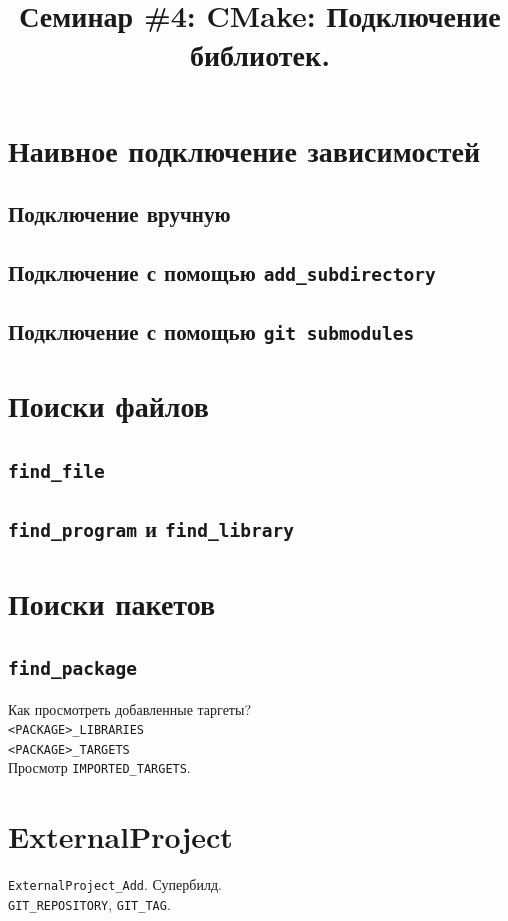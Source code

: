 \documentclass{article}
\begin{document}
\title{Семинар \#4: CMake: Подключение библиотек. \vspace{-5ex}}
\date{}\maketitle

\section{Наивное подключение зависимостей}
\subsection*{Подключение вручную}
\subsection*{Подключение с помощью \texttt{add\_subdirectory}}
\subsection*{Подключение с помощью \texttt{git submodules}}


\section{Поиски файлов}
\subsection*{\texttt{find\_file}}
\subsection*{\texttt{find\_program} и \texttt{find\_library}}


\section{Поиски пакетов}
\subsection*{\texttt{find\_package}}
Как просмотреть добавленные таргеты?\\
\texttt{<PACKAGE>\_LIBRARIES}\\
\texttt{<PACKAGE>\_TARGETS}\\
Просмотр \texttt{IMPORTED\_TARGETS}.


\section{ExternalProject}
\texttt{ExternalProject\_Add}. Супербилд.\\
\texttt{GIT\_REPOSITORY}, \texttt{GIT\_TAG}.
\end{document}
